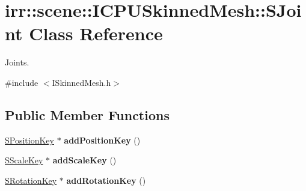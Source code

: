 \hypertarget{classirr_1_1scene_1_1ICPUSkinnedMesh_1_1SJoint}{}\section{irr\+:\+:scene\+:\+:I\+C\+P\+U\+Skinned\+Mesh\+:\+:S\+Joint Class Reference}
\label{classirr_1_1scene_1_1ICPUSkinnedMesh_1_1SJoint}


Joints.  




{\ttfamily \#include $<$I\+Skinned\+Mesh.\+h$>$}

\subsection*{Public Member Functions}
\begin{DoxyCompactItemize}
\item 
\hyperlink{classirr_1_1scene_1_1ICPUSkinnedMesh_1_1SPositionKey}{S\+Position\+Key} $\ast$ {\bfseries add\+Position\+Key} ()\hypertarget{classirr_1_1scene_1_1ICPUSkinnedMesh_1_1SJoint_adec79844ee92db9fa2d036fba8032e8d}{}\label{classirr_1_1scene_1_1ICPUSkinnedMesh_1_1SJoint_adec79844ee92db9fa2d036fba8032e8d}

\item 
\hyperlink{classirr_1_1scene_1_1ICPUSkinnedMesh_1_1SScaleKey}{S\+Scale\+Key} $\ast$ {\bfseries add\+Scale\+Key} ()\hypertarget{classirr_1_1scene_1_1ICPUSkinnedMesh_1_1SJoint_a9cb76e323b07bd234624ae2361f52e2a}{}\label{classirr_1_1scene_1_1ICPUSkinnedMesh_1_1SJoint_a9cb76e323b07bd234624ae2361f52e2a}

\item 
\hyperlink{classirr_1_1scene_1_1ICPUSkinnedMesh_1_1SRotationKey}{S\+Rotation\+Key} $\ast$ {\bfseries add\+Rotation\+Key} ()\hypertarget{classirr_1_1scene_1_1ICPUSkinnedMesh_1_1SJoint_a74bb30fb2bb55e854555a84380ee446b}{}\label{classirr_1_1scene_1_1ICPUSkinnedMesh_1_1SJoint_a74bb30fb2bb55e854555a84380ee446b}

\end{DoxyCompactItemize}
